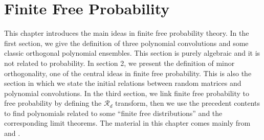 \chapter{Finite Free Probability} \label{ch:finite_free}

This chapter introduces the main ideas in finite free probability theory. In the first section, we give the definition of three polynomial convolutions and some classic orthogonal polynomial ensembles. This section is purely algebraic and it is not related to probability. In section 2, we present the definition of minor orthogonality, one of the central ideas in finite free probability. This is also the section in which we state the initial relations between random matrices and polynomial convolutions. In the third section, we link finite free probability to free probability by defining the $\mathcal R_d$ transform, then we use the precedent contents to find polynomials related to some ``finite free distributions'' and the corresponding limit theorems. The material in this chapter comes mainly from \cite{article:finitefree,article:marcus_finite} and \cite{anaya2016cumulantes}.



